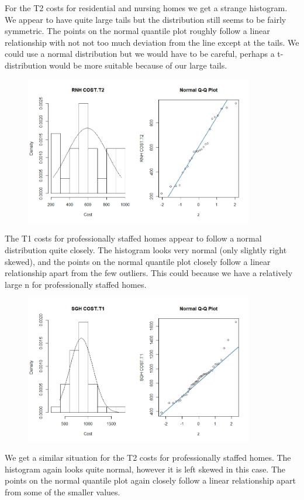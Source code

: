 \documentclass[]{article}
\begin{document}
For the T2 costs for residential and nursing homes we get a strange histogram. We appear to have quite large tails but the distribution still seems to be fairly symmetric. The points on the normal quantile plot roughly follow a linear relationship with not not too much deviation from the line except at the tails. We could use a normal distribution but we would have to be careful, perhaps a t-distribution would be more suitable because of our large tails.
\begin{figure}[H]
\centering
\includegraphics[width=10cm]{RStudio/jpeg/Norm_RNH_T2.jpeg}
\end{figure}
\newpage
The T1 costs for professionally staffed homes appear to follow a normal distribution quite closely. The histogram looks very normal (only slightly right skewed), and the points on the normal quantile plot closely follow a linear relationship apart from the few outliers. This could because we have a relatively large n for professionally staffed homes.
\begin{figure}[H]
\centering
\includegraphics[width=10cm]{RStudio/jpeg/Norm_SGH_T1.jpeg}
\end{figure}
We get a similar situation for the T2 costs for professionally staffed homes. The histogram again looks quite normal, however it is left skewed in this case. The points on the normal quantile plot again closely follow a linear relationship apart from some of the smaller values.
\end{document}
